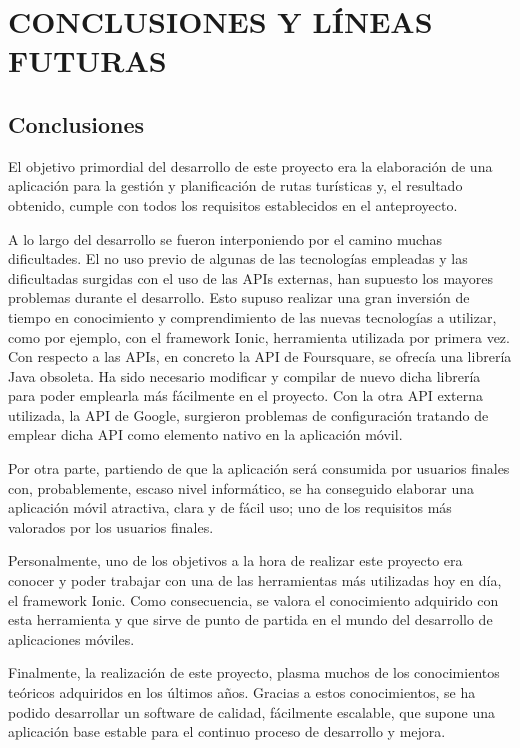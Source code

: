 \chapter[Conclusiones y líneas futuras]{
  \label{chp:conclusiones}
  CONCLUSIONES Y LÍNEAS FUTURAS
}
\thispagestyle{numberingStyle}
\pagestyle{numberingStyle}

\section{Conclusiones}

El objetivo primordial del desarrollo de este proyecto era la elaboración de una aplicación para la gestión y planificación de rutas turísticas y, el resultado obtenido, cumple con todos los requisitos establecidos en el anteproyecto.

A lo largo del desarrollo se fueron interponiendo por el camino muchas dificultades. El no uso previo de algunas de las tecnologías empleadas  y las dificultadas surgidas con el uso de las APIs externas, han supuesto los mayores problemas durante el desarrollo. Esto supuso realizar una gran inversión de tiempo en conocimiento y comprendimiento de las nuevas tecnologías a utilizar, como por ejemplo, con el framework Ionic, herramienta utilizada por primera vez. Con respecto a las APIs, en concreto la API de Foursquare, se ofrecía una librería Java obsoleta. Ha sido necesario modificar y compilar de nuevo dicha librería para poder emplearla más fácilmente en el proyecto. Con la otra API externa utilizada, la API de Google, surgieron problemas de configuración tratando de emplear dicha API como elemento nativo en la aplicación móvil.

Por otra parte, partiendo de que la aplicación será consumida por usuarios finales con, probablemente, escaso nivel informático, se ha conseguido elaborar una aplicación móvil atractiva, clara y de fácil uso; uno de los requisitos más valorados por los usuarios finales.

Personalmente, uno de los objetivos a la hora de realizar este proyecto era conocer y poder trabajar con una de las herramientas más utilizadas hoy en día, el framework Ionic. Como consecuencia, se valora el conocimiento adquirido con esta herramienta y que sirve de punto de partida en el mundo del desarrollo de aplicaciones móviles.

Finalmente, la realización de este proyecto, plasma muchos de los conocimientos teóricos adquiridos en los últimos años. Gracias a estos conocimientos, se ha podido desarrollar un software de calidad, fácilmente escalable, que supone una aplicación base estable para el continuo proceso de desarrollo y mejora.


